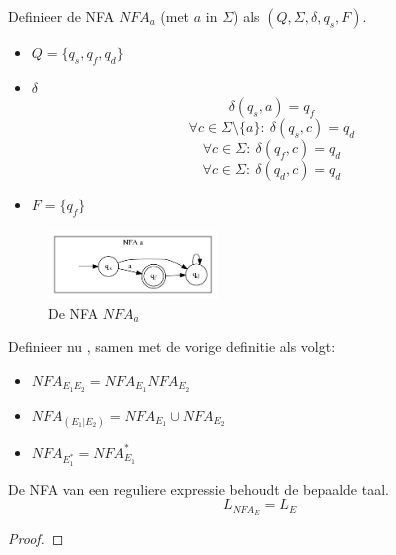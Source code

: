\documentclass[main.tex]{subfiles}
\begin{document}
\begin{de}
  Definieer de NFA $NFA_{a}$ (met $a$ in $\Sigma$) als $(Q, \Sigma, \delta, q_{s}, F)$.

  \begin{itemize}
  \item $Q = \{q_{s},q_{f},q_{d}\}$
  \item $\delta$
    \[ \delta(q_{s}, a) = q_{f} \]
    \[ \forall c \in \Sigma\setminus\{a\}:\ \delta(q_{s}, c) = q_{d} \]
    \[ \forall c \in \Sigma:\ \delta(q_{f}, c) = q_{d}\]
    \[ \forall c \in \Sigma:\ \delta(q_{d}, c) = q_{d}\]
  \item $F = \{q_{f}\}$
  \end{itemize}

  \begin{figure}[H]
    \centering
    \includegraphics[width=0.4\textwidth]{assets/nfa_a.png}      
    \caption{De NFA $NFA_{a}$}
    \label{fig:nfa_a}
  \end{figure}
\end{de}

\begin{de}
  Definieer nu , samen met de vorige definitie als volgt:
  \begin{itemize}
  \item $NFA_{E_{1}E_{2}} = NFA_{E_{1}}NFA_{E_{2}}$
  \item $NFA_{(E_{1}|E_{2})} = NFA_{E_{1}} \cup NFA_{E_{2}}$
  \item $NFA_{E_{1}^{*}} = NFA_{E_{1}}^{*}$
  \end{itemize}
\end{de}

\begin{st}
  De NFA van een reguliere expressie behoudt de bepaalde taal.
  \[ L_{NFA_{E}} = L_{E} \]

  \begin{proof}
  \end{proof}
\end{st}
\end{document}
